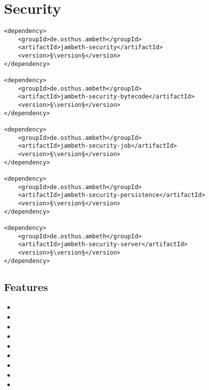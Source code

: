 \section{Security}
\label{module:Security}
\ClearAPI
\TODO
\begin{lstlisting}[style=POM,caption={Maven modules to use \emph{Ambeth Security}}]
<dependency>
	<groupId>de.osthus.ambeth</groupId>
	<artifactId>jambeth-security</artifactId>
	<version>§\version§</version>
</dependency>

<dependency>
	<groupId>de.osthus.ambeth</groupId>
	<artifactId>jambeth-security-bytecode</artifactId>
	<version>§\version§</version>
</dependency>

<dependency>
	<groupId>de.osthus.ambeth</groupId>
	<artifactId>jambeth-security-job</artifactId>
	<version>§\version§</version>
</dependency>

<dependency>
	<groupId>de.osthus.ambeth</groupId>
	<artifactId>jambeth-security-persistence</artifactId>
	<version>§\version§</version>
</dependency>

<dependency>
	<groupId>de.osthus.ambeth</groupId>
	<artifactId>jambeth-security-server</artifactId>
	<version>§\version§</version>
</dependency>
\end{lstlisting}
\subsection{Features}
\begin{itemize}
	\item {}
	\item {}
	\item {}
	\item {}
	\item {}
	\item {}
	\item {}
	\item {}
	\item {}
\end{itemize}


